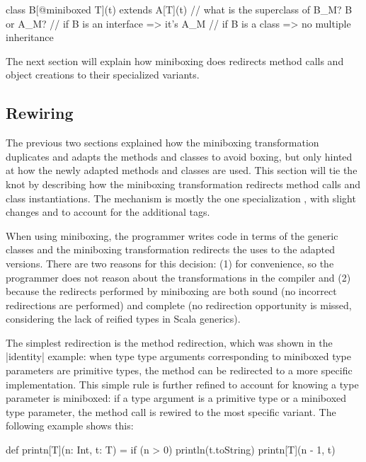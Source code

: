 \begin{lstlisting-nobreak}
 class B[@miniboxed T](t) extends A[T](t)
 // what is the superclass of B_M? B or A_M?
 // if B is an interface => it's A_M
 // if B is a class => no multiple inheritance
\end{lstlisting-nobreak}

The next section will explain how miniboxing does redirects method calls and object creations to their specialized variants.

\subsection{Rewiring}

The previous two sections explained how the miniboxing transformation duplicates and adapts the methods and classes to avoid boxing, but only hinted at how the newly adapted methods and classes are used. This section will tie the knot by describing how the miniboxing transformation redirects method calls and class instantiations. The mechanism is mostly the one specialization \cite{iuli-thesis, specialization-iuli}, with slight changes and to account for the additional tags.

When using miniboxing, the programmer writes code in terms of the generic classes and the miniboxing transformation redirects the uses to the adapted versions. There are two reasons for this decision: (1) for convenience, so the programmer does not reason about the transformations in the compiler and (2) because the redirects performed by miniboxing are both sound (no incorrect redirections are performed) and complete (no redirection opportunity is missed, considering the lack of reified types \cite{michel-thesis, dot-net-generics, dot-net-generics-form} in Scala generics).

The simplest redirection is the method redirection, which was shown in the |identity| example: when type type arguments corresponding to miniboxed type parameters are primitive types, the method can be redirected to a more specific implementation. This simple rule is further refined to account for knowing a type parameter is miniboxed: if a type argument is a primitive type or a miniboxed type parameter, the method call is rewired to the most specific variant. The following example shows this:

\begin{lstlisting-nobreak}
 def printn[T](n: Int, t: T) =
   if (n > 0) {
     println(t.toString)
     printn[T](n - 1, t)
   }
\end{lstlisting-nobreak}

